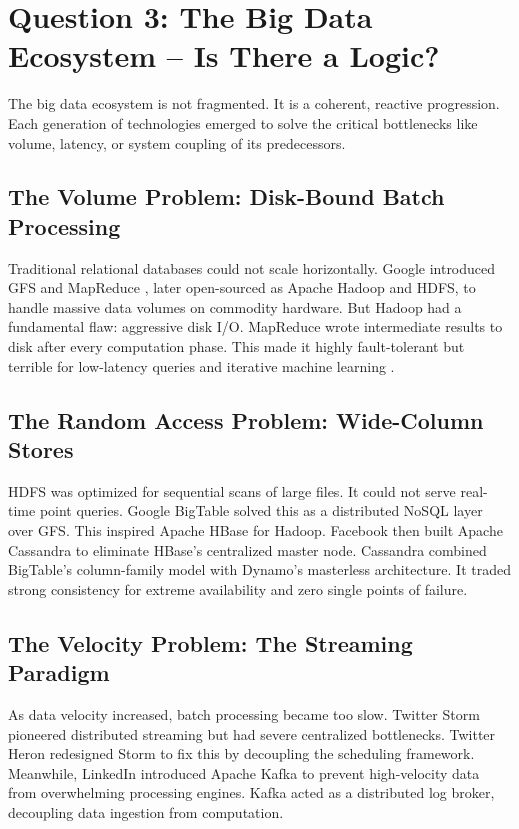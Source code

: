 \section{Question 3: The Big Data Ecosystem -- Is There a Logic?}

The big data ecosystem is not fragmented. It is a coherent, reactive progression. Each generation of technologies emerged to solve the critical bottlenecks like volume, latency, or system coupling of its predecessors.

\subsection{The Volume Problem: Disk-Bound Batch Processing}
Traditional relational databases could not scale horizontally. Google introduced GFS and MapReduce \cite{dean2004mapreduce}, later open-sourced as Apache Hadoop and HDFS, to handle massive data volumes on commodity hardware. But Hadoop had a fundamental flaw: aggressive disk I/O. MapReduce wrote intermediate results to disk after every computation phase. This made it highly fault-tolerant but terrible for low-latency queries and iterative machine learning \cite{zaharia2012resilient}.

\subsection{The Random Access Problem: Wide-Column Stores}
HDFS was optimized for sequential scans of large files. It could not serve real-time point queries. Google BigTable \cite{chang2006bigtable} solved this as a distributed NoSQL layer over GFS. This inspired Apache HBase for Hadoop. Facebook then built Apache Cassandra to eliminate HBase's centralized master node. Cassandra combined BigTable's column-family model with Dynamo's masterless architecture. It traded strong consistency for extreme availability and zero single points of failure.

\subsection{The Velocity Problem: The Streaming Paradigm}
As data velocity increased, batch processing became too slow. Twitter Storm pioneered distributed streaming but had severe centralized bottlenecks. Twitter Heron redesigned Storm to fix this by decoupling the scheduling framework. Meanwhile, LinkedIn introduced Apache Kafka \cite{kreps2011kafka} to prevent high-velocity data from overwhelming processing engines. Kafka acted as a distributed log broker, decoupling data ingestion from computation.


